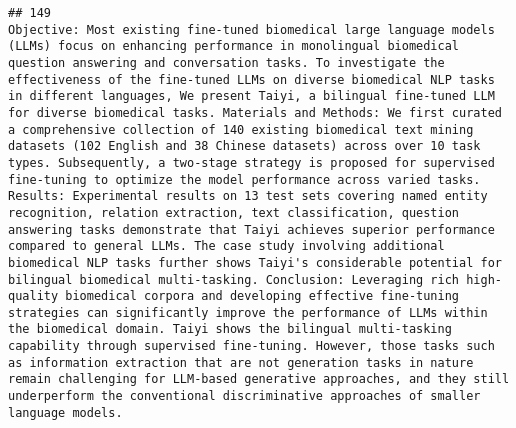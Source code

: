 \documentclass[
]{article}
\begin{document}
\begin{verbatim}
## 149                                                                                                                                                                                                                                                                                                                                             Objective: Most existing fine-tuned biomedical large language models (LLMs) focus on enhancing performance in monolingual biomedical question answering and conversation tasks. To investigate the effectiveness of the fine-tuned LLMs on diverse biomedical NLP tasks in different languages, We present Taiyi, a bilingual fine-tuned LLM for diverse biomedical tasks. Materials and Methods: We first curated a comprehensive collection of 140 existing biomedical text mining datasets (102 English and 38 Chinese datasets) across over 10 task types. Subsequently, a two-stage strategy is proposed for supervised fine-tuning to optimize the model performance across varied tasks. Results: Experimental results on 13 test sets covering named entity recognition, relation extraction, text classification, question answering tasks demonstrate that Taiyi achieves superior performance compared to general LLMs. The case study involving additional biomedical NLP tasks further shows Taiyi's considerable potential for bilingual biomedical multi-tasking. Conclusion: Leveraging rich high-quality biomedical corpora and developing effective fine-tuning strategies can significantly improve the performance of LLMs within the biomedical domain. Taiyi shows the bilingual multi-tasking capability through supervised fine-tuning. However, those tasks such as information extraction that are not generation tasks in nature remain challenging for LLM-based generative approaches, and they still underperform the conventional discriminative approaches of smaller language models.

\end{verbatim}
\end{document}
